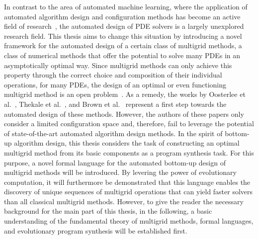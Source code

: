 In contrast to the area of automated machine learning, where the application of automated algorithm design and configuration methods has become an active field of research~\cite{ren2021comprehensive,hutter2019automated,elsken2019neural,he2021automl,schrodi2022towards}, the automated design of PDE solvers is a largely unexplored research field.
This thesis aims to change this situation by introducing a novel framework for the automated design of a certain class of multigrid methods, a class of numerical methods that offer the potential to solve many PDEs in an asymptotically optimal way.
Since multigrid methods can only achieve this property through the correct choice and composition of their individual operations, for many PDEs, the design of an optimal or even functioning multigrid method is an open problem~\cite{trottenberg2000multigrid,ernst2012difficult}.
As a remedy, the works by Oosterlee et al.~\cite{oosterlee2003genetic}, Thekale et al.~\cite{thekale2010optimizing}, and Brown et al.~\cite{brown2021tuning} represent a first step towards the automated design of these methods.
However, the authors of these papers only consider a limited configuration space and, therefore, fail to leverage the potential of state-of-the-art automated algorithm design methods.
In the spirit of bottom-up algorithm design, this thesis considers the task of constructing an optimal multigrid method from its basic components as a program synthesis task.
For this purpose, a novel formal language for the automated bottom-up design of multigrid methods will be introduced.
By levering the power of evolutionary computation, it will furthermore be demonstrated that this language enables the discovery of unique sequences of multigrid operations that can yield faster solvers than all classical multigrid methods.
However, to give the reader the necessary background for the main part of this thesis, in the following, a basic understanding of the fundamental theory of multigrid methods, formal languages, and evolutionary program synthesis will be established first.
